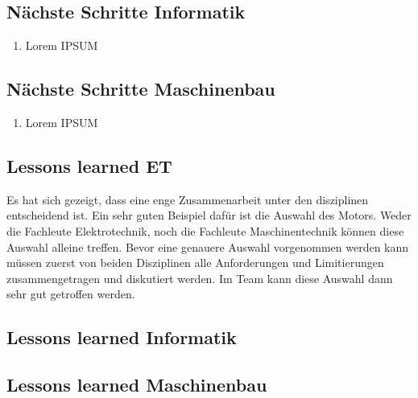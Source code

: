 \documentclass[../../main.tex]{subfiles}
\begin{document}
\subsection{Nächste Schritte Informatik}
\begin{enumerate}
    \item Lorem IPSUM
\end{enumerate}

\subsection{Nächste Schritte Maschinenbau}
\begin{enumerate}
    \item Lorem IPSUM
\end{enumerate}

\subsection{Lessons learned ET}
Es hat sich gezeigt, dass eine enge Zusammenarbeit unter den disziplinen entscheidend ist. Ein sehr guten Beispiel dafür ist die Auswahl des Motors. Weder die Fachleute Elektrotechnik, noch die Fachleute Maschinentechnik können diese Auswahl alleine treffen. Bevor eine genauere Auswahl vorgenommen werden kann müssen zuerst von beiden Disziplinen alle Anforderungen und Limitierungen zusammengetragen und diskutiert werden. Im Team kann diese Auswahl dann sehr gut getroffen werden.
\subsection{Lessons learned Informatik}
\subsection{Lessons learned Maschinenbau}
\end{document}
